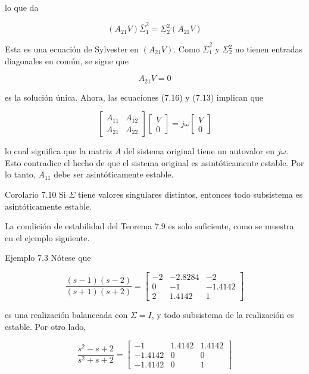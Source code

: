 lo que da

$$
\left(A_{21} V\right) \bar{\Sigma}_{1}^{2}=\Sigma_{2}^{2}\left(A_{21} V\right)
$$

Esta es una ecuación de Sylvester en $\left(A_{21} V\right)$. Como $\bar{\Sigma}_{1}^{2}$ y $\Sigma_{2}^{2}$ no tienen entradas diagonales en común, se sigue que


\begin{equation*}
A_{21} V=0 \tag{7.16}
\end{equation*}


es la solución única. Ahora, las ecuaciones (7.16) y (7.13) implican que

$$
\left[\begin{array}{ll}
A_{11} & A_{12} \\
A_{21} & A_{22}
\end{array}\right]\left[\begin{array}{l}
V \\
0
\end{array}\right]=j \omega\left[\begin{array}{l}
V \\
0
\end{array}\right]
$$

lo cual significa que la matriz $A$ del sistema original tiene un autovalor en $j \omega$. Esto contradice el hecho de que el sistema original es asintóticamente estable. Por lo tanto, $A_{11}$ debe ser asintóticamente estable.

Corolario 7.10 Si $\Sigma$ tiene valores singulares distintos, entonces todo subsistema es asintóticamente estable.

La condición de estabilidad del Teorema 7.9 es solo suficiente, como se muestra en el ejemplo siguiente.

Ejemplo 7.3 Nótese que

$$
\frac{(s-1)(s-2)}{(s+1)(s+2)}=\left[\begin{array}{cc|c}
-2 & -2.8284 & -2 \\
0 & -1 & -1.4142 \\
\hline 2 & 1.4142 & 1
\end{array}\right]
$$

es una realización balanceada con $\Sigma=I$, y todo subsistema de la realización es estable. Por otro lado,

$$
\frac{s^{2}-s+2}{s^{2}+s+2}=\left[\begin{array}{cc|c}
-1 & 1.4142 & 1.4142 \\
-1.4142 & 0 & 0 \\
\hline-1.4142 & 0 & 1
\end{array}\right]
$$

